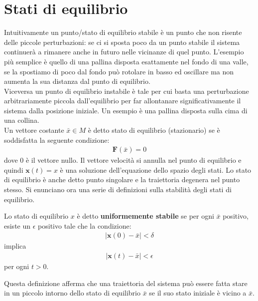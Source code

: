 
\section{Stati di equilibrio} %
\label{sub:stabilità_degli_stati_di_equilibrio}
Intuitivamente un punto/stato di equilibrio stabile è un punto che non risente delle piccole perturbazioni: se ci si sposta poco da un punto stabile il sistema continuerà a rimanere anche in futuro nelle vicinanze di quel punto. L'esempio più semplice è quello di una pallina disposta esattamente nel fondo di una valle, se la spostiamo di poco dal fondo può rotolare in basso ed oscillare ma non aumenta la sua distanza dal punto di equilibrio.\\

Viceversa un punto di equilibrio instabile è tale per cui basta una perturbazione arbitrariamente piccola dall'equilibrio per far allontanare significativamente il sistema dalla posizione iniziale. Un esempio è una pallina disposta sulla cima di una collina.\\

Un vettore costante $\bar{x}\in M$ è detto stato di equilibrio (stazionario) se è soddisfatta la seguente condizione:
\begin{align*}
	\mathbf{F}(\bar{x}) = 0
\end{align*}
dove 0 è il vettore nullo. Il vettore velocità si annulla nel punto di equilibrio e quindi $\mathbf{x}(t) = x$ è una soluzione dell'equazione dello spazio degli stati. Lo stato di equilibrio è anche detto punto singolare e la traiettoria degenera nel punto stesso. Si enunciano ora una serie di definizioni sulla stabilità degli stati di equilibrio.

\begin{mydef}
	Lo stato di equilibrio $x$ è detto \textbf{uniformemente stabile} se per ogni $\bar{x}$ positivo, esiste un $\epsilon$ positivo tale che la condizione:
	\begin{align*}
		\left|\mathbf{x}(0) - \bar{x} \right| < \delta
	\end{align*}
	implica
	\begin{align*}
		\left|\mathbf{x}(t) - \bar{x} \right| < \epsilon
	\end{align*}
	per ogni $t > 0$.
\end{mydef}

Questa definizione afferma che una traiettoria del sistema può essere fatta stare in un piccolo
intorno dello stato di equilibrio $\bar{x}$ se il suo stato iniziale è vicino a $\bar{x}$.

